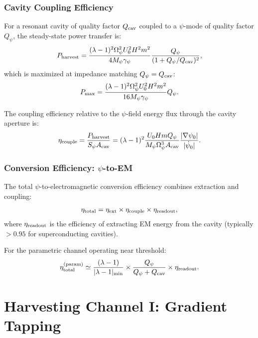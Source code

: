 \documentclass[aps,prd,twocolumn,showpacs,preprintnumbers,superscriptaddress,nofootinbib]{revtex4-2}
\newcommand{\psidot}{\dot{\psi}}
\begin{document}
\subsubsection{Cavity Coupling Efficiency}

For a resonant cavity of quality factor $Q_{\rm cav}$ coupled to a
$\psi$-mode of quality factor $Q_\psi$, the steady-state power transfer is:
\begin{equation}\label{eq:power-transfer}
P_{\rm harvest} = \frac{(\lambda-1)^2\Omega_\psi^2 U_0^2 H^2 m^2}{4M_\psi\gamma_\psi}\frac{Q_\psi}{(1+Q_\psi/Q_{\rm cav})^2},
\end{equation}
which is maximized at impedance matching $Q_\psi = Q_{\rm cav}$:
\begin{equation}\label{eq:power-matched}
P_{\rm max} = \frac{(\lambda-1)^2\Omega_\psi^2 U_0^2 H^2 m^2}{16M_\psi\gamma_\psi}Q_\psi.
\end{equation}

The coupling efficiency relative to the $\psi$-field energy flux through
the cavity aperture is:
\begin{equation}\label{eq:coupling-eff}
\eta_{\rm couple} = \frac{P_{\rm harvest}}{S_\psi A_{\rm cav}} = (\lambda-1)^2 \frac{U_0 H m Q_\psi}{M_\psi\Omega_\psi^3 A_{\rm cav}}\frac{|\nabla\psi_0|}{|\psidot_0|}.
\end{equation}

\subsubsection{Conversion Efficiency: $\psi$-to-EM}

The total $\psi$-to-electromagnetic conversion efficiency combines
extraction and coupling:
\begin{equation}
\eta_{\rm total} = \eta_{\rm ext}\times\eta_{\rm couple}\times\eta_{\rm readout},
\end{equation}
where $\eta_{\rm readout}$ is the efficiency of extracting EM energy from
the cavity (typically $> 0.95$ for superconducting cavities).

For the parametric channel operating near threshold:
\begin{equation}\label{eq:eta-parametric}
\eta_{\rm total}^{(\rm param)} \simeq \frac{(\lambda-1)}{|\lambda-1|_{\rm min}}\times\frac{Q_\psi}{Q_\psi + Q_{\rm cav}}\times\eta_{\rm readout}.
\end{equation}

\section{Harvesting Channel I: Gradient Tapping}\label{sec:gradient}
\end{document}
